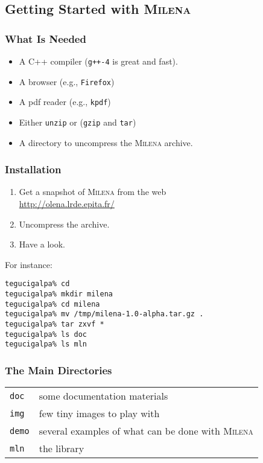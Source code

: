 \documentclass{beamer}
\newcommand{\mln}{\textsc{Milena}\xspace}
\begin{document}
\subsection{Getting Started with \mln}


\begin{frame}
  \frametitle{What Is Needed}

  \begin{itemize}
  \item A C++ compiler (\texttt{g++-4} is great and fast).
  \item A browser (e.g., \texttt{Firefox})
  \item A pdf reader (e.g., \texttt{kpdf})
  \item Either \texttt{unzip} or (\texttt{gzip} and \texttt{tar})
  \item A directory to uncompress the \mln archive.
  \end{itemize}

\end{frame}


\begin{frame}[fragile]
  \frametitle{Installation}

  \begin{enumerate}
    \item Get a snapshot of \mln from the web\\
      {\scriptsize \url{http://olena.lrde.epita.fr/}}
    \item Uncompress the archive.
    \item Have a look. %
  \end{enumerate}

  For instance:

{\tiny
\begin{verbatim}
tegucigalpa% cd
tegucigalpa% mkdir milena
tegucigalpa% cd milena
tegucigalpa% mv /tmp/milena-1.0-alpha.tar.gz .
tegucigalpa% tar zxvf *
tegucigalpa% ls doc
tegucigalpa% ls mln
\end{verbatim}
}

\end{frame}



\begin{frame}
  \frametitle{The Main Directories}

  \begin{center}
    \begin{tabular}{ll}
      \texttt{doc}  & some documentation materials \\
      \texttt{img}  & few tiny images to play with \\
      \texttt{demo} & several examples of what can be done with \mln \\
      \texttt{mln}  & the library \\
    \end{tabular}
  \end{center}

\end{frame}
\end{document}
